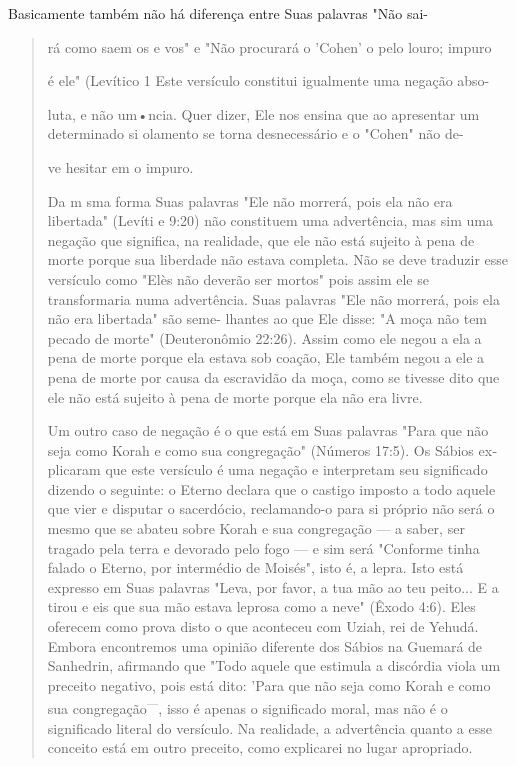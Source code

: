Basicamente também não há diferença entre Suas palavras "Não sai-

\begin{quote}
rá como saem os e vos" e "Não procurará o 'Cohen' o pelo louro; impuro

é ele" (Levítico 1 Este versículo constitui igualmente uma negação abso-

luta, e não um•ncia. Quer dizer, Ele nos ensina que ao apresentar um\\
determinado si olamento se torna desnecessário e o "Cohen" não de-

ve hesitar em o impuro.

Da m sma forma Suas palavras "Ele não morrerá, pois ela não era
libertada" (Levíti e 9:20) não constituem uma advertência, mas sim uma
ne­gação que significa, na realidade, que ele não está sujeito à pena de
morte por­que sua liberdade não estava completa. Não se deve traduzir
esse versículo co­mo "Elès não deverão ser mortos" pois assim ele se
transformaria numa adver­tência. Suas palavras "Ele não morrerá, pois
ela não era libertada" são seme-
lhantes ao que Ele disse: "A moça não tem pecado de morte" (Deuteronômio
22:26). Assim como ele negou a ela a pena de morte porque ela estava sob
coa­ção, Ele também negou a ele a pena de morte por causa da escravidão
da moça, como se tivesse dito que ele não está sujeito à pena de morte
porque ela não era livre.

Um outro caso de negação é o que está em Suas palavras "Para que não
seja como Korah e como sua congregação" (Números 17:5). Os Sábios
ex­plicaram que este versículo é uma negação e interpretam seu
significado dizen­do o seguinte: o Eterno declara que o castigo imposto
a todo aquele que vier e disputar o sacerdócio, reclamando-o para si
próprio não será o mesmo que se abateu sobre Korah e sua congregação ---
a saber, ser tragado pela terra e devorado pelo fogo --- e sim será
"Conforme tinha falado o Eterno, por inter­médio de Moisés", isto é, a
lepra. Isto está expresso em Suas palavras "Leva, por favor, a tua mão
ao teu peito... E a tirou e eis que sua mão estava leprosa como a neve"
(Êxodo 4:6). Eles oferecem como prova disto o que aconteceu com Uziah,
rei de Yehudá. Embora encontremos uma opinião diferente dos Sá­bios na
Guemará de Sanhedrin, afirmando que "Todo aquele que estimula a
discórdia viola um preceito negativo, pois está dito: 'Para que não seja
como Korah e como sua congregação\textsuperscript{---}, isso é apenas o
significado moral, mas não é o significado literal do versículo. Na
realidade, a advertência quanto a esse conceito está em outro preceito,
como explicarei no lugar apropriado.


\end{quote}
